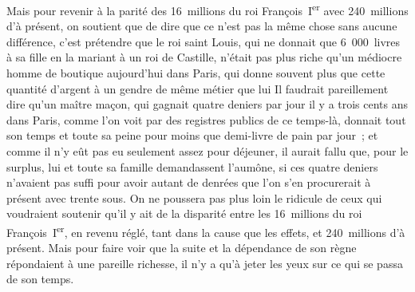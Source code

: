 \documentclass[french,twoside]{book} %
\begin{document}
Mais pour revenir à la parité des 16 millions du roi François I\textsuperscript{er} avec 240 millions d’à présent, on soutient que de dire que ce n’est pas la même chose sans aucune différence, c’est prétendre que le roi saint Louis, qui ne donnait que 6 000 livres à sa fille en la mariant à un roi de Castille, n’était pas plus riche qu’un médiocre homme de boutique aujourd’hui dans Paris, qui donne souvent plus que cette quantité d’argent à un gendre de même métier que lui Il faudrait pareillement dire qu’un maître maçon, qui gagnait quatre deniers par jour il y a trois cents ans dans Paris, comme l’on voit par des registres publics de ce temps-là, donnait tout son temps et toute sa peine pour moins que demi-livre de pain par jour ; et comme il n’y eût pas eu seulement assez pour déjeuner, il aurait fallu que, pour le surplus, lui et toute sa famille demandassent l’aumône, si ces quatre deniers n’avaient pas suffi pour avoir autant de denrées que l’on s’en procurerait à présent avec trente sous. On ne poussera pas plus loin le ridicule de ceux qui voudraient soutenir qu’il y ait de la disparité entre les 16 millions du roi François I\textsuperscript{er}, en revenu réglé, tant dans la cause que les effets, et 240 millions d’à présent. Mais pour faire voir que la suite et la dépendance de son règne répondaient à une pareille richesse, il n’y a qu’à jeter les yeux sur ce qui se passa de son temps.\par
\end{document}
